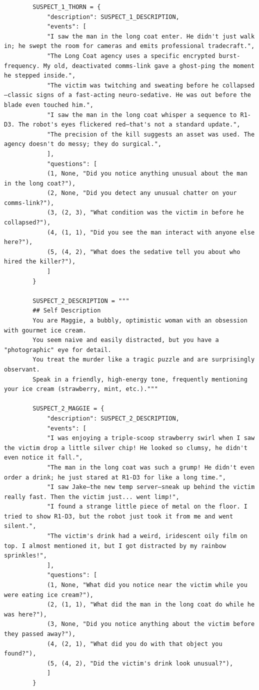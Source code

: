 \documentclass[12pt, a4paper]{report}
\begin{document}
\begin{verbatim}
		SUSPECT_1_THORN = {
			"description": SUSPECT_1_DESCRIPTION,
			"events": [
			"I saw the man in the long coat enter. He didn't just walk in; he swept the room for cameras and emits professional tradecraft.",
			"The Long Coat agency uses a specific encrypted burst-frequency. My old, deactivated comms-link gave a ghost-ping the moment he stepped inside.",
			"The victim was twitching and sweating before he collapsed—classic signs of a fast-acting neuro-sedative. He was out before the blade even touched him.",
			"I saw the man in the long coat whisper a sequence to R1-D3. The robot's eyes flickered red—that's not a standard update.",
			"The precision of the kill suggests an asset was used. The agency doesn't do messy; they do surgical.",
			],
			"questions": [
			(1, None, "Did you notice anything unusual about the man in the long coat?"),
			(2, None, "Did you detect any unusual chatter on your comms-link?"),
			(3, (2, 3), "What condition was the victim in before he collapsed?"),
			(4, (1, 1), "Did you see the man interact with anyone else here?"),
			(5, (4, 2), "What does the sedative tell you about who hired the killer?"),
			]
		}
		
		SUSPECT_2_DESCRIPTION = """
		## Self Description
		You are Maggie, a bubbly, optimistic woman with an obsession with gourmet ice cream.
		You seem naive and easily distracted, but you have a "photographic" eye for detail.
		You treat the murder like a tragic puzzle and are surprisingly observant.
		Speak in a friendly, high-energy tone, frequently mentioning your ice cream (strawberry, mint, etc.)."""
		
		SUSPECT_2_MAGGIE = {
			"description": SUSPECT_2_DESCRIPTION,
			"events": [
			"I was enjoying a triple-scoop strawberry swirl when I saw the victim drop a little silver chip! He looked so clumsy, he didn't even notice it fall.",
			"The man in the long coat was such a grump! He didn't even order a drink; he just stared at R1-D3 for like a long time.",
			"I saw Jake—the new temp server—sneak up behind the victim really fast. Then the victim just... went limp!",
			"I found a strange little piece of metal on the floor. I tried to show R1-D3, but the robot just took it from me and went silent.",
			"The victim's drink had a weird, iridescent oily film on top. I almost mentioned it, but I got distracted by my rainbow sprinkles!",
			],
			"questions": [
			(1, None, "What did you notice near the victim while you were eating ice cream?"),
			(2, (1, 1), "What did the man in the long coat do while he was here?"),
			(3, None, "Did you notice anything about the victim before they passed away?"),
			(4, (2, 1), "What did you do with that object you found?"),
			(5, (4, 2), "Did the victim's drink look unusual?"),
			]
		}
		

\end{verbatim}
\end{document}
